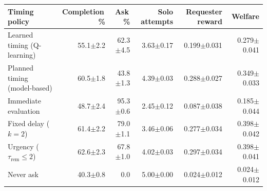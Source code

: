 \begin{tabular}{lrrrrr}
\toprule
Timing policy & Completion\,\% & Ask\,\% & Solo attempts & Requester reward & Welfare \\
\midrule
Learned timing (Q-learning) & 55.1{\scriptsize$\pm$2.2} & 62.3{\scriptsize$\pm$4.5} & 3.63{\scriptsize$\pm$0.17} & 0.199{\scriptsize$\pm$0.031} & 0.279{\scriptsize$\pm$0.041} \\
Planned timing (model-based) & 60.5{\scriptsize$\pm$1.8} & 43.8{\scriptsize$\pm$1.3} & 4.39{\scriptsize$\pm$0.03} & 0.288{\scriptsize$\pm$0.027} & 0.349{\scriptsize$\pm$0.033} \\
Immediate evaluation & 48.7{\scriptsize$\pm$2.4} & 95.3{\scriptsize$\pm$0.6} & 2.45{\scriptsize$\pm$0.12} & 0.087{\scriptsize$\pm$0.038} & 0.185{\scriptsize$\pm$0.044} \\
Fixed delay ($k=2$) & 61.4{\scriptsize$\pm$2.2} & 79.0{\scriptsize$\pm$1.1} & 3.46{\scriptsize$\pm$0.06} & 0.277{\scriptsize$\pm$0.034} & 0.398{\scriptsize$\pm$0.042} \\
Urgency ($\tau_{\mathrm{rem}}\le 2$) & 62.6{\scriptsize$\pm$2.3} & 67.8{\scriptsize$\pm$1.0} & 4.02{\scriptsize$\pm$0.03} & 0.297{\scriptsize$\pm$0.034} & 0.398{\scriptsize$\pm$0.041} \\
Never ask & 40.3{\scriptsize$\pm$0.8} & 0.0 & 5.00{\scriptsize$\pm$0.00} & 0.024{\scriptsize$\pm$0.012} & 0.024{\scriptsize$\pm$0.012} \\
\bottomrule
\end{tabular}
